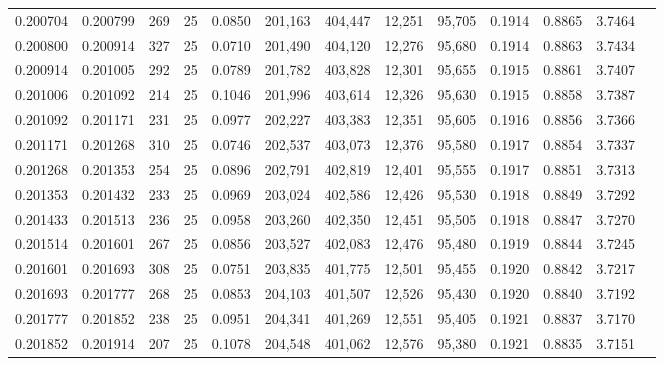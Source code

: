 \begin{tabular}{rrrrrrrrrrrrr}
0.200704 & 0.200799 &   269 &  25 &                                     0.0850 & 201,163 & 404,447 &  12,251 &  95,705 & 0.1914 & 0.8865 & 3.7464 \\
0.200800 & 0.200914 &   327 &  25 &                                     0.0710 & 201,490 & 404,120 &  12,276 &  95,680 & 0.1914 & 0.8863 & 3.7434 \\
0.200914 & 0.201005 &   292 &  25 &                                     0.0789 & 201,782 & 403,828 &  12,301 &  95,655 & 0.1915 & 0.8861 & 3.7407 \\
0.201006 & 0.201092 &   214 &  25 &                                     0.1046 & 201,996 & 403,614 &  12,326 &  95,630 & 0.1915 & 0.8858 & 3.7387 \\
0.201092 & 0.201171 &   231 &  25 &                                     0.0977 & 202,227 & 403,383 &  12,351 &  95,605 & 0.1916 & 0.8856 & 3.7366 \\
0.201171 & 0.201268 &   310 &  25 &                                     0.0746 & 202,537 & 403,073 &  12,376 &  95,580 & 0.1917 & 0.8854 & 3.7337 \\
0.201268 & 0.201353 &   254 &  25 &                                     0.0896 & 202,791 & 402,819 &  12,401 &  95,555 & 0.1917 & 0.8851 & 3.7313 \\
0.201353 & 0.201432 &   233 &  25 &                                     0.0969 & 203,024 & 402,586 &  12,426 &  95,530 & 0.1918 & 0.8849 & 3.7292 \\
0.201433 & 0.201513 &   236 &  25 &                                     0.0958 & 203,260 & 402,350 &  12,451 &  95,505 & 0.1918 & 0.8847 & 3.7270 \\
0.201514 & 0.201601 &   267 &  25 &                                     0.0856 & 203,527 & 402,083 &  12,476 &  95,480 & 0.1919 & 0.8844 & 3.7245 \\
0.201601 & 0.201693 &   308 &  25 &                                     0.0751 & 203,835 & 401,775 &  12,501 &  95,455 & 0.1920 & 0.8842 & 3.7217 \\
0.201693 & 0.201777 &   268 &  25 &                                     0.0853 & 204,103 & 401,507 &  12,526 &  95,430 & 0.1920 & 0.8840 & 3.7192 \\
0.201777 & 0.201852 &   238 &  25 &                                     0.0951 & 204,341 & 401,269 &  12,551 &  95,405 & 0.1921 & 0.8837 & 3.7170 \\
0.201852 & 0.201914 &   207 &  25 &                                     0.1078 & 204,548 & 401,062 &  12,576 &  95,380 & 0.1921 & 0.8835 & 3.7151 \\

\end{tabular}
